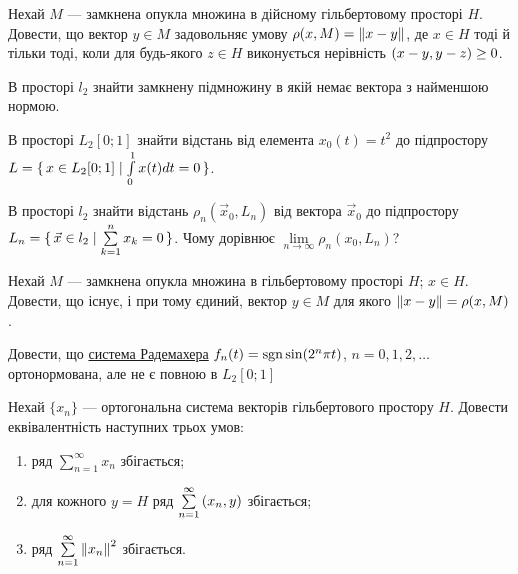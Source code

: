 \begin{exercise}
    Нехай $M$ --- замкнена опукла множина в дійсному гільбертовому просторі $H$.
    Довести, що вектор $y \in M$ задовольняє умову $\rho(x, M) = \left\lVert x-y\right\rVert$,
    де $x \in H$ тоді й тільки тоді, коли для будь-якого $z \in H$ виконується
    нерівність $\left(x-y, y-z\right) \geq 0$.
\end{exercise}

\begin{exercise}
    В просторі $l_2$ знайти замкнену підмножину в якій немає вектора з найменшою нормою.
\end{exercise}

\begin{exercise}
    В просторі $L_2[0;1]$ знайти відстань від елемента $x_0(t) = t^2$ до підпростору
    $L = \set{x \in L_2[0;1] \mid \int\limits_0^1x(t)dt = 0}$.
\end{exercise}

\begin{exercise}
    В просторі $l_2$ знайти відстань $\rho_n(\vec{x}_0, L_n)$ від вектора $\vec{x}_0$ до
    підпростору $L_n = \set{ \vec{x}\in l_2 \mid \sum\limits^n_{k=1} x_k = 0}$.
    Чому дорівнює $\lim\limits_{n \to \infty} \rho_n(x_0, L_n)$?
\end{exercise}

\begin{exercise}
    Нехай $M$ --- замкнена опукла множина в гільбертовому просторі $H$; $x \in H$.
    Довести, що існує, і при тому єдиний, вектор $y \in M$ для якого $\left\lVert x-y\right\rVert =
    \rho(x, M)$.
\end{exercise}

\begin{exercise}
    Довести, що \underline{система Радемахера} $f_n(t) = \operatorname{sgn}\sin(2^n \pi t)$,
    $n=0,1,2,\dots$ ортонормована, але не є повною в $L_2[0;1]$
\end{exercise}

\begin{exercise}
    Нехай $\{x_n\}$ --- ортогональна система векторів гільбертового простору $H$.
    Довести еквівалентність наступних трьох умов:
    \begin{enumerate}[label=\ukr*)]
        \item ряд $\sum\limits^\infty_{n=1} x_n$ збігається;
        \item для кожного $y=H$ ряд $\sum\limits^\infty_{n=1} \left(x_n, y\right)$ збігається;
        \item ряд $\sum\limits^\infty_{n=1} \left\lVert x_n\right\rVert^2$ збігається.
    \end{enumerate}
\end{exercise}

